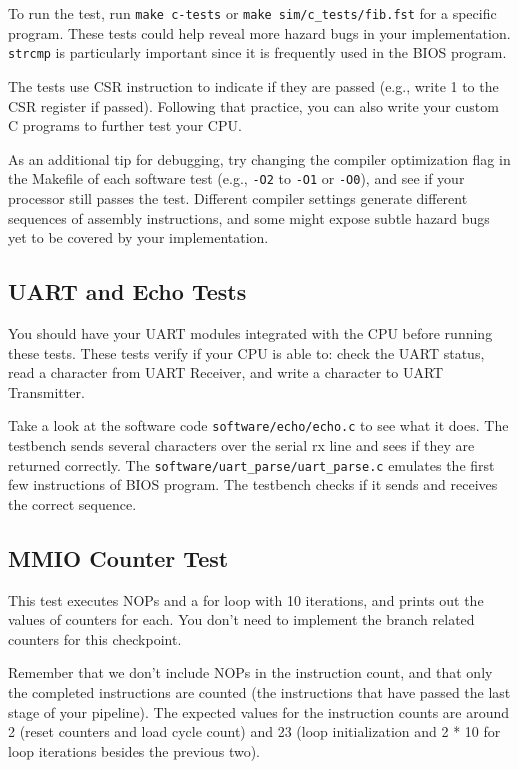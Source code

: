To run the test, run \verb|make c-tests| or \verb|make sim/c_tests/fib.fst| for a specific program.
These tests could help reveal more hazard bugs in your implementation.
\verb|strcmp| is particularly important since it is frequently used in the BIOS program.

The tests use CSR instruction to indicate if they are passed
(e.g., write 1 to the CSR register if passed).
Following that practice, you can also write your custom C programs to further test your CPU.

As an additional tip for debugging, try changing the compiler optimization flag in the Makefile
of each software test (e.g., \verb|-O2| to \verb|-O1| or \verb|-O0|),
and see if your processor still passes the test.
Different compiler settings generate different sequences of assembly instructions,
and some might expose subtle hazard bugs yet to be covered by your implementation.

\subsection{UART and Echo Tests}
You should have your UART modules integrated with the CPU before running these tests.
These tests verify if your CPU is able to: check the UART status,
read a character from UART Receiver, and write a character to UART Transmitter.

Take a look at the software code \verb|software/echo/echo.c| to see what it does.
The testbench sends several characters over the serial rx line and sees if they are returned correctly.
The \verb|software/uart_parse/uart_parse.c| emulates the first few instructions of BIOS program.
The testbench checks if it sends and receives the correct sequence.

\subsection{MMIO Counter Test}
This test executes NOPs and a for loop with 10 iterations,
and prints out the values of counters for each.
You don't need to implement the branch related counters for this checkpoint.

Remember that we don't include NOPs in the instruction count,
and that only the completed instructions are counted
(the instructions that have passed the last stage of your pipeline).
The expected values for the instruction counts are around
2 (reset counters and load cycle count)
and 23 (loop initialization and 2 * 10 for loop iterations besides the previous two).

